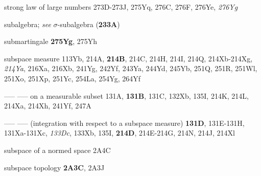 strong law of large numbers
273D-273J, 
275Yq, 276C, 276F, 276Ye, {\it 276Yg}








































subalgebra;  
  {\it see} 
$\sigma$-subalgebra ({\bf 233A})
















submartingale {\bf 275Yg}, 275Yh













subspace measure 113Yb,
  214A, {\bf 214B}, 214C, 214H, 214I, 214Q,
214Xb-214Xg, 
{\it 214Ya}, 216Xa, 216Xb, 241Yg, 242Yf, 243Ya, 244Yd,
245Yb, 251Q, 251R, 251Wl, 251Xo, 251Xp, 251Yc, 254La, 254Yg, 264Yf  

----- -----  on a measurable subset 131A, {\bf 131B}, 131C, 132Xb,
135I,
  214K, 214L, 214Xa, 214Xh, 241Yf, 247A  

----- -----  (integration with respect to a subspace measure) {\bf 131D},
131E-131H, 
131Xa-131Xc, 
{\it 133Dc}, 133Xb, 135I,
  {\bf 214D}, 214E-214G, 
214N, 214J, 214Xl

subspace of a normed space 2A4C


subspace topology {\bf 2A3C}, 2A3J




